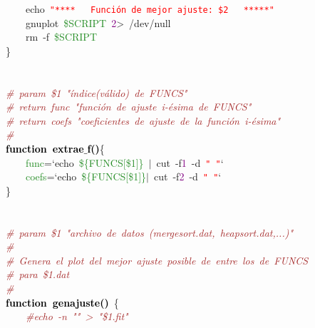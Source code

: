 \mbox{}\ \ \ \ echo\ \texttt{\textcolor{Red}{"{}****\ \ \ Función\ de\ mejor\ ajuste:\ \$2\ \ \ *****"{}}} \\
\mbox{}\ \ \ \ gnuplot\ \textcolor{ForestGreen}{\$SCRIPT}\ \textcolor{Purple}{2}\textcolor{BrickRed}{\textgreater{}}\ /dev/null \\
\mbox{}\ \ \ \ rm\ -f\ \textcolor{ForestGreen}{\$SCRIPT} \\
\mbox{}\} \\
\mbox{} \\
\mbox{} \\
\mbox{}\textit{\textcolor{Brown}{\#\ param\ \$1\ "{}índice(válido)\ de\ FUNCS"{}}} \\
\mbox{}\textit{\textcolor{Brown}{\#\ return\ func\ "{}función\ de\ ajuste\ i-ésima\ de\ FUNCS"{}}} \\
\mbox{}\textit{\textcolor{Brown}{\#\ return\ coefs\ "{}coeficientes\ de\ ajuste\ de\ la\ función\ i-ésima"{}}} \\
\mbox{}\textit{\textcolor{Brown}{\#}} \\
\mbox{}\textbf{\textcolor{Black}{function\ extrae$\_$f()}}\{ \\
\mbox{}\ \ \ \ \textcolor{ForestGreen}{func}\textcolor{BrickRed}{=}`echo\ \textcolor{ForestGreen}{\$\{FUNCS[\$1]\}}\ \textcolor{BrickRed}{$|$}\ cut\ -f\textcolor{Purple}{1}\ -d\ \texttt{\textcolor{Red}{"{}\ "{}}}` \\
\mbox{}\ \ \ \ \textcolor{ForestGreen}{coefs}\textcolor{BrickRed}{=}`echo\ \textcolor{ForestGreen}{\$\{FUNCS[\$1]\}}\textcolor{BrickRed}{$|$}\ cut\ -f\textcolor{Purple}{2}\ -d\ \texttt{\textcolor{Red}{"{}\ "{}}}` \\
\mbox{}\}\ \ \ \  \\
\mbox{} \\
\mbox{} \\
\mbox{}\textit{\textcolor{Brown}{\#\ param\ \$1\ "{}archivo\ de\ datos\ (mergesort.dat,\ heapsort.dat,...)"{}}} \\
\mbox{}\textit{\textcolor{Brown}{\#\ }} \\
\mbox{}\textit{\textcolor{Brown}{\#\ Genera\ el\ plot\ del\ mejor\ ajuste\ posible\ de\ entre\ los\ de\ FUNCS}} \\
\mbox{}\textit{\textcolor{Brown}{\#\ para\ \$1.dat}} \\
\mbox{}\textit{\textcolor{Brown}{\#}} \\
\mbox{}\textbf{\textcolor{Black}{function\ genajuste()}}\ \{ \\
\mbox{}\ \ \ \ \textit{\textcolor{Brown}{\#echo\ -n\ "{}"{}\ \textgreater{}\ "{}\$1.fit"{}}} \\
